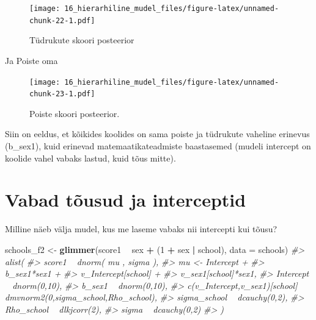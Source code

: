 \documentclass[]{book}
\newenvironment{Shaded}{\begin{snugshade}}{\end{snugshade}}
\newcommand{\CommentTok}[1]{\textcolor[rgb]{0.56,0.35,0.01}{\textit{#1}}}
\newcommand{\DataTypeTok}[1]{\textcolor[rgb]{0.13,0.29,0.53}{#1}}
\newcommand{\DecValTok}[1]{\textcolor[rgb]{0.00,0.00,0.81}{#1}}
\newcommand{\KeywordTok}[1]{\textcolor[rgb]{0.13,0.29,0.53}{\textbf{#1}}}
\newcommand{\NormalTok}[1]{#1}
\newcommand{\OperatorTok}[1]{\textcolor[rgb]{0.81,0.36,0.00}{\textbf{#1}}}
\newcommand{\StringTok}[1]{\textcolor[rgb]{0.31,0.60,0.02}{#1}}
\begin{document}
\begin{figure}
\centering
\texttt{[image: 16\_hierarhiline\_mudel\_files/figure-latex/unnamed-chunk-22-1.pdf]}
\caption{\label{fig:unnamed-chunk-22}Tüdrukute skoori posteerior}
\end{figure}

Ja Poiste oma

\begin{Shaded}
\end{Shaded}

\begin{figure}
\centering
\texttt{[image: 16\_hierarhiline\_mudel\_files/figure-latex/unnamed-chunk-23-1.pdf]}
\caption{\label{fig:unnamed-chunk-23}Poiste skoori posteerior.}
\end{figure}

Siin on eeldus, et kõikides koolides on sama poiste ja tüdrukute vaheline erinevus (b\_sex1), kuid erinevad matemaatikateadmiste baastasemed (mudeli intercept on koolide vahel vabaks lastud, kuid tõus mitte).

\hypertarget{vabad-tousud-ja-interceptid}{%
\section{Vabad tõusud ja interceptid}\label{vabad-tousud-ja-interceptid}}

Milline näeb välja mudel, kus me laseme vabaks nii intercepti kui tõusu?

\begin{Shaded}
\begin{Highlighting}[]
\NormalTok{schools_f2 <-}\StringTok{ }\KeywordTok{glimmer}\NormalTok{(score1 }\OperatorTok{~}\StringTok{ }\NormalTok{sex }\OperatorTok{+}\StringTok{ }\NormalTok{(}\DecValTok{1} \OperatorTok{+}\StringTok{ }\NormalTok{sex }\OperatorTok{|}\StringTok{ }\NormalTok{school), }\DataTypeTok{data =}\NormalTok{ schools)}
\CommentTok{#> alist(}
\CommentTok{#>     score1 ~ dnorm( mu , sigma ),}
\CommentTok{#>     mu <- Intercept +}
\CommentTok{#>         b_sex1*sex1 +}
\CommentTok{#>         v_Intercept[school] +}
\CommentTok{#>         v_sex1[school]*sex1,}
\CommentTok{#>     Intercept ~ dnorm(0,10),}
\CommentTok{#>     b_sex1 ~ dnorm(0,10),}
\CommentTok{#>     c(v_Intercept,v_sex1)[school] ~ dmvnorm2(0,sigma_school,Rho_school),}
\CommentTok{#>     sigma_school ~ dcauchy(0,2),}
\CommentTok{#>     Rho_school ~ dlkjcorr(2),}
\CommentTok{#>     sigma ~ dcauchy(0,2)}
\CommentTok{#> )}
\end{Highlighting}
\end{Shaded}
\end{document}
